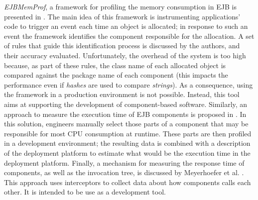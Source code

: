 \textit{EJBMemProf}, a framework for profiling the memory consumption in EJB is presented in \cite{Meyerhoefer2005}.
The main idea of this framework is instrumenting applications' code to trigger an event each time an object is allocated; in response to such an event the framework identifies the component responsible for the allocation.
A set of rules that guide this identification process is discussed by the authors, and their accuracy evaluated.
Unfortunately, the overhead of the system is too high because, as part of these rules, the class name of each allocated object is compared against the package name of each component (this impacts the performance even if \textit{hashes} are used to compare \textit{strings}).
As a consequence, using the framework in a production environment is not possible.
Instead, this tool aims at supporting the development of component-based software.
Similarly, an approach to measure the execution time of EJB components is proposed in \cite{Meyerhofer05towardsplatform-independent}.
In this solution, engineers manually select those parts of a component that may be responsible for most CPU consumption at runtime.
These parts are then profiled in a development environment; the resulting data is combined with a description of the deployment platform to estimate what would be the execution time in the deployment platform.
Finally, a mechanism for measuring the response time of components, as well as the invocation tree, is discussed by Meyerhoefer et al. \cite{Meyerhoefer2007}.
This approach uses interceptors to collect data about how components calls each other.
It is intended to be use as a development tool.


